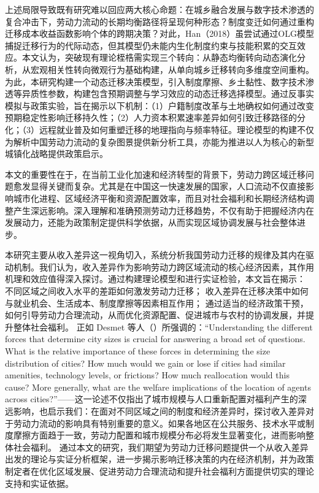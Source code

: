 \documentclass[a4paper,12pt]{article}
\begin{document}
上述局限导致既有研究难以回应两大核心命题：在城乡融合发展与数字技术渗透的复合冲击下，劳动力流动的长期均衡路径将呈现何种形态？制度变迁如何通过重构迁移成本收益函数影响个体的跨期决策？对此，Han（2018）虽尝试通过OLG模型捕捉迁移行为的代际动态，但其模型仍未能内生化制度约束与技能积累的交互效应。本文认为，突破现有理论桎梏需实现三个转向：从静态均衡转向动态演化分析，从宏观相关性转向微观行为基础构建，从单向城乡迁移转向多维度空间重构。为此，本研究构建一个动态迁移决策模型，引入制度摩擦、乡土黏性、数字技术渗透等异质性参数，构建包含预期调整与学习效应的动态迁移选择模型。通过反事实模拟与政策实验，旨在揭示以下机制：（1）户籍制度改革与土地确权如何通过改变预期稳定性影响迁移持久性；（2）人力资本积累速率差异如何引致迁移路径的分化；（3）远程就业普及如何重塑迁移的地理指向与频率特征。理论模型的构建不仅为解析中国劳动力流动的复杂图景提供新分析工具，亦能为推进以人为核心的新型城镇化战略提供政策启示。


本文的重要性在于，在当前工业化加速和经济转型的背景下，劳动力跨区域迁移问题愈发显得关键而复杂。尤其是在中国这一快速发展的国家，人口流动不仅直接影响城市化进程、区域经济平衡和资源配置效率，而且对社会福利和长期经济结构调整产生深远影响。深入理解和准确预测劳动力迁移趋势，不仅有助于把握经济内在发展动力，还能为政策制定提供科学依据，从而实现区域协调发展与社会整体进步。

本研究主要从收入差异这一视角切入，系统分析我国劳动力迁移的规律及其内在驱动机制。我们认为，收入差异作为影响劳动力跨区域流动的核心经济因素，其作用机理和效应值得深入探讨。通过构建理论模型和进行实证检验，本文旨在揭示： 不同区域之间收入水平的差距如何激发劳动力迁移；  收入差异在迁移决策中如何与就业机会、生活成本、制度摩擦等因素相互作用；  通过适当的经济政策干预，如何引导劳动力合理流动，从而优化资源配置、促进城市与农村的协调发展，并提升整体社会福利。
正如 Desmet 等人（\cite{desmetUrbanAccountingWelfare2013}）所强调的：“Understanding the different forces that determine city sizes is crucial for answering a broad set of questions. What is the relative importance of these forces in determining the size distribution of cities? How much would we gain or lose if cities had similar amenities, technology levels, or frictions? How much reallocation would this cause? More generally, what are the welfare implications of the location of agents across cities?”——这一论述不仅指出了城市规模与人口重新配置对福利产生的深远影响，也启示我们：在面对不同区域之间的制度和经济差异时，探讨收入差异对于劳动力流动的影响具有特别重要的意义。如果各地区在公共服务、技术水平或制度摩擦方面趋于一致，劳动力配置和城市规模分布必将发生显著变化，进而影响整体社会福利。
通过本文的研究，我们期望为劳动力迁移问题提供一个从收入差异出发的理论与实证分析框架，进一步揭示影响迁移决策的内在经济机制，并为政策制定者在优化区域发展、促进劳动力合理流动和提升社会福利方面提供切实的理论支持和实证依据。
\end{document}

